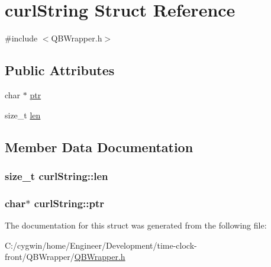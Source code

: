 \hypertarget{structcurl_string}{}\section{curl\+String Struct Reference}
\label{structcurl_string}


{\ttfamily \#include $<$Q\+B\+Wrapper.\+h$>$}

\subsection*{Public Attributes}
\begin{DoxyCompactItemize}
\item 
char $\ast$ \hyperlink{structcurl_string_ae68a5e11430086a48372ad1edfab2e21}{ptr}
\item 
size\+\_\+t \hyperlink{structcurl_string_af99fd950c8789b7c5ca72cb0a789dd6e}{len}
\end{DoxyCompactItemize}


\subsection{Member Data Documentation}
\hypertarget{structcurl_string_af99fd950c8789b7c5ca72cb0a789dd6e}{}
\subsubsection[{len}]{\setlength{\rightskip}{0pt plus 5cm}size\+\_\+t curl\+String\+::len}\label{structcurl_string_af99fd950c8789b7c5ca72cb0a789dd6e}
\hypertarget{structcurl_string_ae68a5e11430086a48372ad1edfab2e21}{}
\subsubsection[{ptr}]{\setlength{\rightskip}{0pt plus 5cm}char$\ast$ curl\+String\+::ptr}\label{structcurl_string_ae68a5e11430086a48372ad1edfab2e21}


The documentation for this struct was generated from the following file\+:\begin{DoxyCompactItemize}
\item 
C\+:/cygwin/home/\+Engineer/\+Development/time-\/clock-\/front/\+Q\+B\+Wrapper/\hyperlink{_q_b_wrapper_8h}{Q\+B\+Wrapper.\+h}\end{DoxyCompactItemize}
